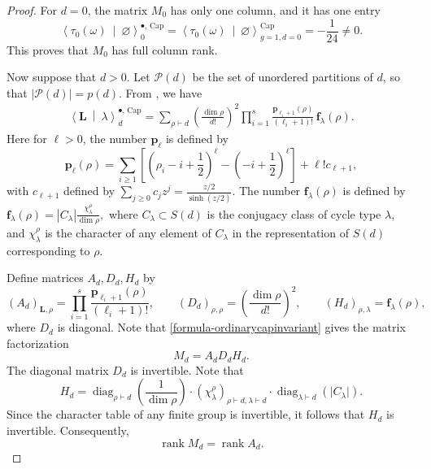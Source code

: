 \documentclass[letterpaper,12pt]{amsart}
\theoremstyle{definition}
\newcommand{\rank}{\operatorname{rank}}
\numberwithin{equation}{section}
\begin{document}
\begin{proof}
For $d=0$, the matrix \(M_0\) has only one column, and it has one entry
\[
\left\langle
\tau_0(\omega)
\ \middle|\
\varnothing
\right\rangle^{\bullet,\,\mathrm{Cap}}_0
=
\left\langle
\tau_0(\omega)
\ \middle|\
\varnothing
\right\rangle^{\mathrm{Cap}}_{g=1,d=0}
=
-\frac{1}{24}\neq 0.
\]
This proves that \(M_0\) has full column rank.

Now suppose that $d>0$. Let \(\mathcal P(d)\) be the set of unordered partitions of \(d\), so that
\(|\mathcal P(d)|=p(d)\).  From \cite[Theorem~1]{OP1}, we have
\begin{align}\label{formula-ordinarycapinvariant}
\left\langle
\mathbf L
\ \middle|\
\lambda
\right\rangle^{\bullet,\,\mathrm{Cap}}_d
=
\sum_{\rho\vdash d}
\left(\frac{\dim\rho}{d!}\right)^2
\prod_{i=1}^{s}
\frac{\mathbf p_{\ell_i+1}(\rho)}{(\ell_i+1)!}\,
\mathbf f_\lambda(\rho).
\end{align}
Here for $\ell>0$, the number $\mathbf p_\ell$ is defined by \[\mathbf p_{\ell}(\rho)=\sum_{i\ge1}[(\rho_i-i+\frac12)^\ell-(-i+\frac12)^\ell]+\ell!c_{\ell+1},\] with $c_{\ell+1}$ defined by 
\(\sum_{j\ge0}c_jz^j=\frac{z/2}{\sinh(z/2)}\). The number $\mathbf f_\lambda(\rho)$ is defined by
\(\mathbf f_\lambda(\rho)
=
|C_\lambda|
\frac{\chi^\rho_\lambda}{\dim\rho},
\)
where \(C_\lambda\subset S(d)\) is the conjugacy class of cycle type
\(\lambda\), and \(\chi^\rho_\lambda\) is the character of any element of $C_\lambda$ in the representation of $S(d)$ corresponding to \(\rho\).


Define matrices $A_d, D_d, H_d$ by
\[
(A_d)_{\mathbf L,\rho}
=
\prod_{i=1}^{s}
\frac{\mathbf p_{\ell_i+1}(\rho)}{(\ell_i+1)!},
\qquad
(D_d)_{\rho,\rho}
=
\left(\frac{\dim\rho}{d!}\right)^2,
\qquad
(H_d)_{\rho,\lambda}
=
\mathbf f_\lambda(\rho),
\]
where $D_d$ is diagonal. Note that \eqref{formula-ordinarycapinvariant} gives the matrix factorization
\[
M_d=A_dD_dH_d.
\]
The diagonal matrix \(D_d\) is invertible.  Note that
\[
H_d
=
\operatorname{diag}_{\rho\vdash d}
\left(\frac{1}{\dim \rho}\right)
\cdot
\left(\chi_{\lambda}^{\rho}\right)_{\rho\vdash d,\lambda\vdash d}
\cdot
\operatorname{diag}_{\lambda\vdash d}
\left(\lvert C_{\lambda}\rvert\right).
\]
Since the character table of any finite group is invertible, it follows that \(H_d\) is invertible. Consequently,
\[
\rank M_d=\rank A_d.
\]


\end{proof}
\end{document}
